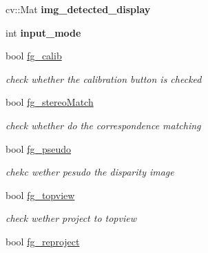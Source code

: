 \begin{DoxyCompactItemize}
\item 
\hypertarget{classstereo__vision_a4b4f5cedee0992e723f184d5ca0ef9cf}{}cv\+::\+Mat {\bfseries img\+\_\+detected\+\_\+display}\label{classstereo__vision_a4b4f5cedee0992e723f184d5ca0ef9cf}

\item 
\hypertarget{classstereo__vision_aa224d5b51573aab0080fe501ec13595f}{}int {\bfseries input\+\_\+mode}\label{classstereo__vision_aa224d5b51573aab0080fe501ec13595f}

\item 
\hypertarget{classstereo__vision_a43d90438c1816a2d8ea75bf70fa66ad9}{}bool \hyperlink{classstereo__vision_a43d90438c1816a2d8ea75bf70fa66ad9}{fg\+\_\+calib}\label{classstereo__vision_a43d90438c1816a2d8ea75bf70fa66ad9}

\begin{DoxyCompactList}\small\item\em check whether the calibration button is checked \end{DoxyCompactList}\item 
\hypertarget{classstereo__vision_aa4cd54587f4089a1780ee3b3e622720f}{}bool \hyperlink{classstereo__vision_aa4cd54587f4089a1780ee3b3e622720f}{fg\+\_\+stereo\+Match}\label{classstereo__vision_aa4cd54587f4089a1780ee3b3e622720f}

\begin{DoxyCompactList}\small\item\em check whether do the correspondence matching \end{DoxyCompactList}\item 
\hypertarget{classstereo__vision_a9046c0d1af87b98a5848070199a980ba}{}bool \hyperlink{classstereo__vision_a9046c0d1af87b98a5848070199a980ba}{fg\+\_\+pseudo}\label{classstereo__vision_a9046c0d1af87b98a5848070199a980ba}

\begin{DoxyCompactList}\small\item\em chekc wether pesudo the disparity image \end{DoxyCompactList}\item 
\hypertarget{classstereo__vision_a46c04908475380f5901a0a7a08f5643c}{}bool \hyperlink{classstereo__vision_a46c04908475380f5901a0a7a08f5643c}{fg\+\_\+topview}\label{classstereo__vision_a46c04908475380f5901a0a7a08f5643c}

\begin{DoxyCompactList}\small\item\em check wether project to topview \end{DoxyCompactList}\item 
\hypertarget{classstereo__vision_ab1be52b3eb3c5629d81655fbc5dab14d}{}bool \hyperlink{classstereo__vision_ab1be52b3eb3c5629d81655fbc5dab14d}{fg\+\_\+reproject}\label{classstereo__vision_ab1be52b3eb3c5629d81655fbc5dab14d}


\end{DoxyCompactItemize}
